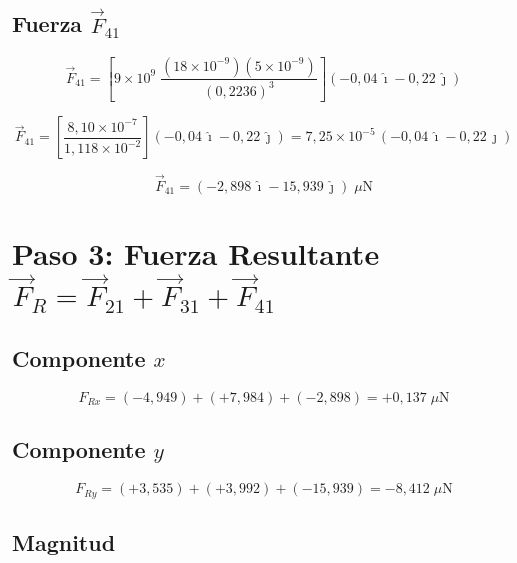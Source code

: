 \documentclass[12pt,letterpaper]{article}
\begin{document}
\subsection*{Fuerza $\vec{F}_{41}$}

\begin{equation*}
\vec{F}_{41} = \left[9\times10^9\;\frac{(18\times10^{-9})(5\times10^{-9})}{(0{,}2236)^3}\right]
\left(-0{,}04\,\hat{\imath} - 0{,}22\,\hat{\jmath}\right)
\end{equation*}

\begin{equation*}
\vec{F}_{41} = \left[\frac{8{,}10\times10^{-7}}{1{,}118\times10^{-2}}\right]
\left(-0{,}04\,\hat{\imath} - 0{,}22\,\hat{\jmath}\right)
= 7{,}25\times10^{-5}\,
\left(-0{,}04\,\hat{\imath} - 0{,}22\,\hat{\jmath}\right)
\end{equation*}

\begin{equation*}
\boxed{\vec{F}_{41} = \left(-2{,}898\,\hat{\imath} - 15{,}939\,\hat{\jmath}\right)\;\mu\text{N}}
\end{equation*}

\section*{Paso 3: Fuerza Resultante $\vec{F}_R = \vec{F}_{21} + \vec{F}_{31} + \vec{F}_{41}$}

\subsection*{Componente $x$}

\begin{equation*}
F_{Rx} = (-4{,}949) + (+7{,}984) + (-2{,}898) = +0{,}137\;\mu\text{N}
\end{equation*}

\subsection*{Componente $y$}

\begin{equation*}
F_{Ry} = (+3{,}535) + (+3{,}992) + (-15{,}939) = -8{,}412\;\mu\text{N}
\end{equation*}

\subsection*{Magnitud}
\end{document}
